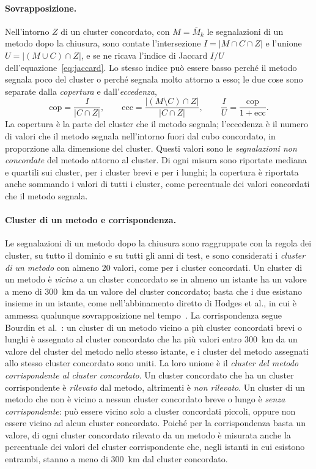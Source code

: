 \paragraph{Sovrapposizione.} Nell'intorno $Z$ di un cluster concordato, con $M=\bar{M}_k$ le segnalazioni di un metodo dopo la chiusura, sono contate l'intersezione $I=|M\cap C\cap Z|$ e l'unione $U=|(M\cup C)\cap Z|$, e se ne ricava l'indice di Jaccard $I/U$ dell'equazione~\eqref{eq:jaccard}. Lo stesso indice può essere basso perché il metodo segnala poco del cluster o perché segnala molto attorno a esso; le due cose sono separate dalla \emph{copertura} e dall'\emph{eccedenza},
\begin{equation}
\mathrm{cop}=\frac{I}{|C\cap Z|},\qquad
\mathrm{ecc}=\frac{|(M\setminus C)\cap Z|}{|C\cap Z|},\qquad
\frac{I}{U}=\frac{\mathrm{cop}}{1+\mathrm{ecc}} .
\end{equation}
La copertura è la parte del cluster che il metodo segnala; l'eccedenza è il numero di valori che il metodo segnala nell'intorno fuori dal cubo concordato, in proporzione alla dimensione del cluster. Questi valori sono le \emph{segnalazioni non concordate} del metodo attorno al cluster. Di ogni misura sono riportate mediana e quartili sui cluster, per i cluster brevi e per i lunghi; la copertura è riportata anche sommando i valori di tutti i cluster, come percentuale dei valori concordati che il metodo segnala.

\paragraph{Cluster di un metodo e corrispondenza.} Le segnalazioni di un metodo dopo la chiusura sono raggruppate con la regola dei cluster, su tutto il dominio e su tutti gli anni di test, e sono considerati i \emph{cluster di un metodo} con almeno 20 valori, come per i cluster concordati. Un cluster di un metodo è \emph{vicino} a un cluster concordato se in almeno un istante ha un valore a meno di 300~km da un valore del cluster concordato; basta che i due esistano insieme in un istante, come nell'abbinamento diretto di Hodges et al., in cui è ammessa qualunque sovrapposizione nel tempo~\cite{hodges2017tc}. La corrispondenza segue Bourdin et al.~\cite{bourdin2022tc}: un cluster di un metodo vicino a più cluster concordati brevi o lunghi è assegnato al cluster concordato che ha più valori entro 300~km da un valore del cluster del metodo nello stesso istante, e i cluster del metodo assegnati allo stesso cluster concordato sono uniti. La loro unione è il \emph{cluster del metodo corrispondente al cluster concordato}. Un cluster concordato che ha un cluster corrispondente è \emph{rilevato} dal metodo, altrimenti è \emph{non rilevato}. Un cluster di un metodo che non è vicino a nessun cluster concordato breve o lungo è \emph{senza corrispondente}: può essere vicino solo a cluster concordati piccoli, oppure non essere vicino ad alcun cluster concordato. Poiché per la corrispondenza basta un valore, di ogni cluster concordato rilevato da un metodo è misurata anche la percentuale dei valori del cluster corrispondente che, negli istanti in cui esistono entrambi, stanno a meno di 300~km dal cluster concordato.

